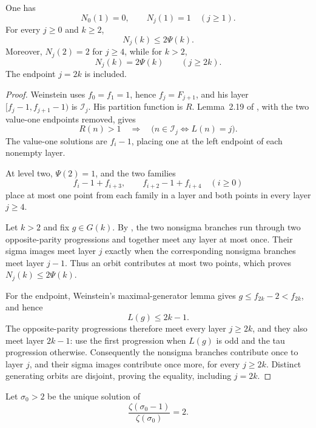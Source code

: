 \begin{lemma}
\label{lem:uniform-layer-count}
One has
\[
 N_0(1)=0,\qquad N_j(1)=1\quad(j\ge1).
\]
For every \(j\ge0\) and \(k\ge2\),
\[
 N_j(k)\le2\Psi(k).
\]
Moreover, \(N_j(2)=2\) for \(j\ge4\), while for \(k>2\),
\[
 N_j(k)=2\Psi(k)\qquad(j\ge2k).
\]
The endpoint \(j=2k\) is included.
\end{lemma}

\begin{proof}
Weinstein uses \(f_0=f_1=1\), hence \(f_j=F_{j+1}\), and his layer
\([f_j-1,f_{j+1}-1)\) is \(\mathcal I_j\).  His partition function is
\(R\).  Lemma~2.19 of \cite{Weinstein2016}, with the two value-one
endpoints removed, gives
\begin{equation}
 R(n)>1\quad\Longrightarrow\quad
 \bigl(n\in\mathcal I_j\iff L(n)=j\bigr).
 \label{eq:layer-largest-index}
\end{equation}
The value-one solutions are \(f_i-1\), placing one at the left endpoint of
each nonempty layer.

At level two, \(\Psi(2)=1\), and the two families
\[
 f_i-1+f_{i+3},\qquad f_{i+2}-1+f_{i+4}\quad(i\ge0)
\]
place at most one point from each family in a layer and both points in every
layer \(j\ge4\).

Let \(k>2\) and fix \(g\in G(k)\).  By
, the two nonsigma branches run through two
opposite-parity progressions and together meet any layer at most once.  Their
sigma images meet layer \(j\) exactly when the corresponding nonsigma
branches meet layer \(j-1\).  Thus an orbit contributes at most two points,
which proves \(N_j(k)\le2\Psi(k)\).

For the endpoint, Weinstein's maximal-generator lemma gives
\(g\le f_{2k}-2<f_{2k}\), and hence
\begin{equation}
 L(g)\le2k-1.
 \label{eq:generator-largest-index-bound}
\end{equation}
The opposite-parity progressions therefore meet every layer \(j\ge2k\), and
they also meet layer \(2k-1\): use the first progression when \(L(g)\) is
odd and the tau progression otherwise.  Consequently the nonsigma branches
contribute once to layer \(j\), and their sigma images contribute once more,
for every \(j\ge2k\).  Distinct generating orbits are disjoint, proving the
equality, including \(j=2k\).
\end{proof}

Let \(\sigma_0>2\) be the unique solution of
\begin{equation}
 \frac{\zeta(\sigma_0-1)}{\zeta(\sigma_0)}=2.
 \label{eq:freezing-exponent}
\end{equation}

